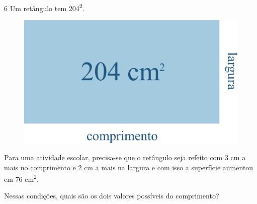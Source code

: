 \begin{emptybox}
\end{emptybox}

\num{6} Um retângulo tem 204\textsuperscript{2}.

\begin{figure}[htpb!]
\centering
\includegraphics[width=.6\textwidth]{./ilustras-mat/modulo_7-atividade_6.png}
\end{figure}

Para uma atividade escolar, precisa-se que o retângulo seja refeito com 3
cm a mais no comprimento e 2 cm a mais na largura e com isso a
superfície aumentou em 76 cm\textsuperscript{2}.

Nessas condições, quais são os dois valores possíveis do comprimento?

\begin{emptybox}
\coment{
\vspace{5cm}







}
\end{emptybox}

